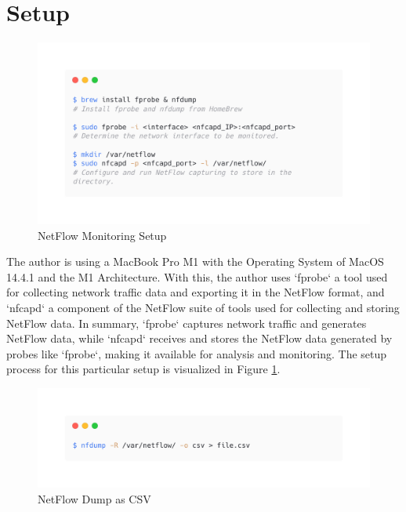 \documentclass{article}
\begin{document}
\section{Setup}

\begin{figure}[htbp]
    \centering
    \includegraphics[trim=0 100 0 100,clip,width=1\linewidth]{img/nf-carbon.png}
    \caption{NetFlow Monitoring Setup}
    \label{fig:nfsetup}
\end{figure}

The author is using a MacBook Pro M1 with the Operating System of MacOS 14.4.1 and the M1 Architecture. With this, the author uses `fprobe` a tool used for collecting network traffic data and exporting it in the NetFlow format, and `nfcapd` a component of the NetFlow suite of tools used for collecting and storing NetFlow data. In summary, `fprobe` captures network traffic and generates NetFlow data, while `nfcapd` receives and stores the NetFlow data generated by probes like `fprobe`, making it available for analysis and monitoring. The setup process for this particular setup is visualized in Figure \ref{fig:nfsetup}.

\begin{figure}[H]
    \centering
    \includegraphics[trim=0 100 0 100,clip,width=1\linewidth]{img/nfd-carbon.png}
    \caption{NetFlow Dump as CSV}
    \label{fig:nfdump}
\end{figure}
\end{document}

